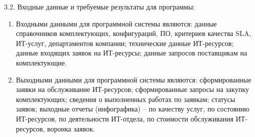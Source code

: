 {\parindent0pt
  3.2. Входные данные и требуемые результаты для программы:}

\begin{enumerate}[label=\arabic*)]
\item Входными данными для программной системы являются: данные
справочников комплектующих, конфигураций, ПО, критериев качества SLA,
ИТ-услуг, департаментов компании; технические данные ИТ-ресурсов; данные входящих заявок на ИТ-ресурсы; данные запросов поставщикам на комплектующие.
\item Выходными данными для программной системы являются: сформированные заявки на обслуживание ИТ-ресурсов; сформированные запросы на
закупку комплектующих; сведения о выполненных работах по заявкам; статусы заявок; выходные отчеты (инфографика) – по качеству услуг, по состоянию ИТ-ресурсов, по деятельности ИТ-отдела, по стоимости обслуживания
ИТ-ресурсов, воронка заявок.
\end{enumerate}

